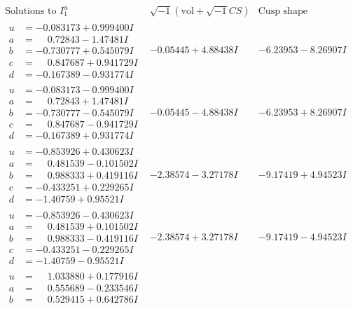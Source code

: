 \documentclass[1p]{elsarticle_modified}
\theoremstyle{definition}
\newcommand{\I}{\sqrt{-1}}
\begin{document}
$$\begin{array}{c|c|c}  
\text{Solutions to }I^u_{1}& \I (\text{vol} + \sqrt{-1}CS) & \text{Cusp shape}\\
 \hline 
\begin{aligned}
u &= -0.083173 + 0.999400 I \\
a &= \phantom{-}0.72843 - 1.47481 I \\
b &= -0.730777 + 0.545079 I \\
c &= \phantom{-}0.847687 + 0.941729 I \\
d &= -0.167389 - 0.931774 I\end{aligned}
 & -0.05445 + 4.88438 I & -6.23953 - 8.26907 I \\ \hline\begin{aligned}
u &= -0.083173 - 0.999400 I \\
a &= \phantom{-}0.72843 + 1.47481 I \\
b &= -0.730777 - 0.545079 I \\
c &= \phantom{-}0.847687 - 0.941729 I \\
d &= -0.167389 + 0.931774 I\end{aligned}
 & -0.05445 - 4.88438 I & -6.23953 + 8.26907 I \\ \hline\begin{aligned}
u &= -0.853926 + 0.430623 I \\
a &= \phantom{-}0.481539 - 0.101502 I \\
b &= \phantom{-}0.988333 + 0.419116 I \\
c &= -0.433251 + 0.229265 I \\
d &= -1.40759 + 0.95521 I\end{aligned}
 & -2.38574 - 3.27178 I & -9.17419 + 4.94523 I \\ \hline\begin{aligned}
u &= -0.853926 - 0.430623 I \\
a &= \phantom{-}0.481539 + 0.101502 I \\
b &= \phantom{-}0.988333 - 0.419116 I \\
c &= -0.433251 - 0.229265 I \\
d &= -1.40759 - 0.95521 I\end{aligned}
 & -2.38574 + 3.27178 I & -9.17419 - 4.94523 I \\ \hline\begin{aligned}
u &= \phantom{-}1.033880 + 0.177916 I \\
a &= \phantom{-}0.555689 - 0.233546 I \\
b &= \phantom{-}0.529415 + 0.642786 I \\

\end{aligned}
\end{array}$$
\end{document}
